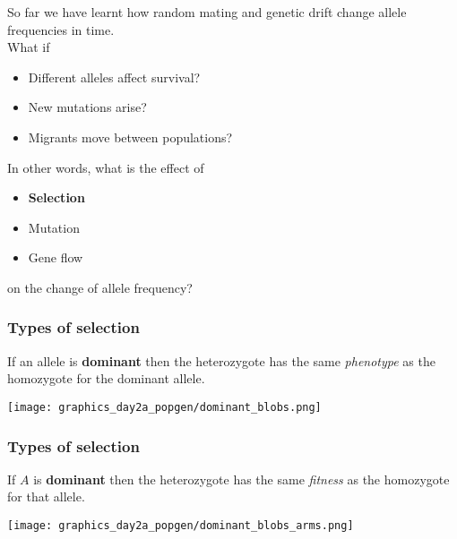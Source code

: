 \documentclass{beamer}
\newcommand{\1}{\ensuremath{\mathbf{1}}}
\begin{document}
%
%
%
\begin{frame}
	So far we have learnt how random mating and genetic drift change allele frequencies in time.\\
	What if
	\begin{itemize}
		\item Different alleles affect survival?
		\item New mutations arise?
		\item Migrants move between populations?
	\end{itemize}
\end{frame}
%
%
%
\begin{frame}
	In other words, what is the effect of
	\begin{itemize}
		\item \textbf{Selection}
		\item Mutation
		\item Gene flow
	\end{itemize}
	on the change of allele frequency?
\end{frame}
%
%
%
\begin{frame}\frametitle{Types of selection}
	If an allele is \textbf{dominant} then the heterozygote has the same \emph{phenotype} as the homozygote for the dominant allele.
	\begin{center}
		\texttt{[image: graphics\_day2a\_popgen/dominant\_blobs.png]}
	\end{center}
\end{frame}
%
%
%
\begin{frame}\frametitle{Types of selection}
	If $A$ is \textbf{dominant} then the heterozygote has the same \emph{fitness} as the homozygote for that allele.
	\begin{center}
		\texttt{[image: graphics\_day2a\_popgen/dominant\_blobs\_arms.png]}
	\end{center}
\end{frame}
\end{document}
